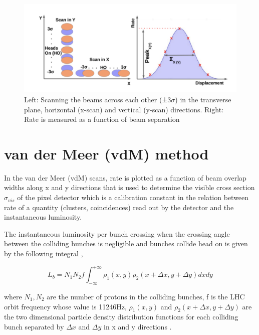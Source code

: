 \begin{figure}[h]
    \centering
    \includegraphics[width=1\textwidth]{ashish_thesis/vdm_method.png}
    \caption[Schematic of van der Meer scan]{Left: Scanning the beams across each other (±3$\sigma$) in the transverse plane, horizontal (x-scan) and vertical (y-scan) directions. Right: Rate is measured as a function of beam separation}
    \label{fig:vdm_scan_method}
\end{figure}



\section{van der Meer (vdM) method}

In the van der Meer (vdM) scans,  rate is plotted as a function of beam overlap widths along x and y directions that is used to determine the visible cross section $\sigma_{vis}$ of the pixel detector which is a calibration constant in the relation between rate of a quantity (clusters, coincidences) read out by the detector and the instantaneous luminosity. 

The instantaneous luminosity  per bunch crossing when the crossing angle between the colliding bunches is negligible and bunches collide head on is given by the following integral \cite{CMS-PAS-LUM-13-001}, 

\begin{equation}
L_{b} = N_1 N_2 f \int^{+\infty}_{-\infty} \rho_1(x,y) \rho_2(x+\Delta x, y+\Delta y) dx dy 
\end{equation}

where $N_1, N_2$ are the number of protons in the colliding bunches, f is the LHC orbit frequency whose value is 11246Hz,  $\rho_1(x,y)$ and $\rho_2(x+\Delta x,y+\Delta y)$ are the two dimensional particle density distribution functions for each colliding bunch separated by $\Delta x$ and $\Delta y$ in x and y directions  \cite{CMS-PAS-LUM-17-004}. 

